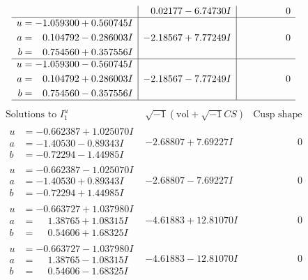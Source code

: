 \documentclass[1p]{elsarticle_modified}
\theoremstyle{definition}
\newcommand{\I}{\sqrt{-1}}
\begin{document}
$$\begin{array}{c|c|c}
 & \phantom{-}0.02177 - 6.74730 I & \phantom{-0.000000 } 0 \\ \hline\begin{aligned}
u &= -1.059300 + 0.560745 I \\
a &= \phantom{-}0.104792 - 0.286003 I \\
b &= \phantom{-}0.754560 + 0.357556 I\end{aligned}
 & -2.18567 + 7.77249 I & \phantom{-0.000000 } 0 \\ \hline\begin{aligned}
u &= -1.059300 - 0.560745 I \\
a &= \phantom{-}0.104792 + 0.286003 I \\
b &= \phantom{-}0.754560 - 0.357556 I\end{aligned}
 & -2.18567 - 7.77249 I & \phantom{-0.000000 } 0\\
 \hline 
 \end{array}$$\newpage$$\begin{array}{c|c|c}  
\text{Solutions to }I^u_{1}& \I (\text{vol} + \sqrt{-1}CS) & \text{Cusp shape}\\
 \hline 
\begin{aligned}
u &= -0.662387 + 1.025070 I \\
a &= -1.40530 - 0.89343 I \\
b &= -0.72294 - 1.44985 I\end{aligned}
 & -2.68807 + 7.69227 I & \phantom{-0.000000 } 0 \\ \hline\begin{aligned}
u &= -0.662387 - 1.025070 I \\
a &= -1.40530 + 0.89343 I \\
b &= -0.72294 + 1.44985 I\end{aligned}
 & -2.68807 - 7.69227 I & \phantom{-0.000000 } 0 \\ \hline\begin{aligned}
u &= -0.663727 + 1.037980 I \\
a &= \phantom{-}1.38765 + 1.08315 I \\
b &= \phantom{-}0.54606 + 1.68325 I\end{aligned}
 & -4.61883 + 12.81070 I & \phantom{-0.000000 } 0 \\ \hline\begin{aligned}
u &= -0.663727 - 1.037980 I \\
a &= \phantom{-}1.38765 - 1.08315 I \\
b &= \phantom{-}0.54606 - 1.68325 I\end{aligned}
 & -4.61883 - 12.81070 I & \phantom{-0.000000 } 0 \\ \hline\begin{aligned}

\end{aligned}
\end{array}$$
\end{document}

